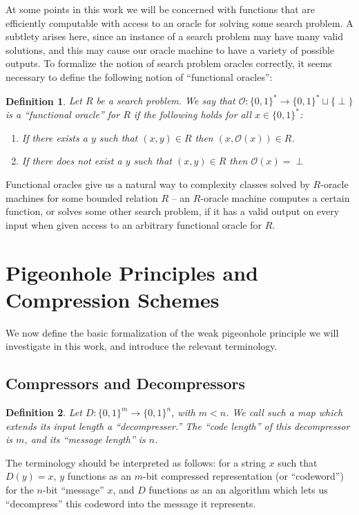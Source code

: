 \documentclass[11pt]{article}
\newtheorem{definition}{Definition}
\newcommand{\B}{\{0,1\}}
\def\cl{\bf}
\begin{document}
At some points in this work we will be concerned with functions that are efficiently computable with access to an oracle for solving some search problem. A subtlety arises here, since an instance of a search problem may have many valid solutions, and this may cause our oracle machine to have a variety of possible outputs. To formalize the notion of search problem oracles correctly, it seems necessary to define the following notion of ``functional oracles'':
\begin{definition}
Let $R$ be a search problem. We say that $\mathcal{O}\colon \B^* \rightarrow \B^* \sqcup \{\perp\}$ is a ``functional oracle'' for $R$ if the following holds for all $x \in \B^*$:
\begin{enumerate}
    \item If there exists a $y$ such that $(x,y) \in R$ then $(x,\mathcal{O}(x)) \in R$.
    \item If there does not exist a $y$ such that $(x,y) \in R$ then $\mathcal{O}(x) = \perp$
\end{enumerate} 
\end{definition}
Functional oracles give us a natural way to complexity classes solved by $R$-oracle machines for some bounded relation $R$ -- an $R$-oracle machine computes a certain function, or solves some other search problem, if it has a valid output on every input when given access to an arbitrary functional oracle for $R$.

\section{Pigeonhole Principles and Compression Schemes}\label{sec:pigeons}
We now define the basic formalization of the weak pigeonhole principle we will investigate in this work, and introduce the relevant terminology.
\subsection{Compressors and Decompressors}\label{subsec:gi}
\begin{definition}
Let $D\colon \B^m \rightarrow \B^n$, with $m < n$. We call such a map which extends its input length a ``decompresser.'' The ``code length'' of this decompressor is $m$, and its ``message length'' is $n$.
\end{definition}
The terminology should be interpreted as follows: for a string $x$ such that $D(y)=x$, $y$ functions as an $m$-bit compressed representation (or ``codeword'') for the $n$-bit ``message'' $x$, and $D$ functions as an an algorithm which lets us ``decompress'' this codeword into the message it represents.
\end{document}
